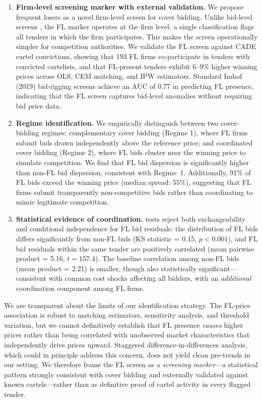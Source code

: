 \begin{enumerate}
\item \textbf{Firm-level screening marker with external validation.} We propose frequent losers as a novel firm-level screen for cover bidding. Unlike bid-level screens \citep{bajari2003deciding, imhof2019detecting}, the FL marker operates at the firm level: a single classification flags all tenders in which the firm participates. This makes the screen operationally simpler for competition authorities. We validate the FL screen against CADE cartel convictions, showing that 193 FL firms co-participate in tenders with convicted cartelists, and that FL-present tenders exhibit 6--9\% higher winning prices across OLS, CEM matching, and IPW estimators. Standard Imhof (2019) bid-rigging screens achieve an AUC of 0.77 in predicting FL presence, indicating that the FL screen captures bid-level anomalies without requiring bid price data.

\item \textbf{Regime identification.} We empirically distinguish between two cover-bidding regimes: complementary cover bidding (Regime 1), where FL firms submit bids drawn independently above the reference price; and coordinated cover bidding (Regime 2), where FL bids cluster near the winning price to simulate competition. We find that FL bid dispersion is significantly higher than non-FL bid dispersion, consistent with Regime~1. Additionally, 91\% of FL bids exceed the winning price (median spread: 55\%), suggesting that FL firms submit transparently non-competitive bids rather than coordinating to mimic legitimate competition.

\item \textbf{Statistical evidence of coordination.} \citet{bajari2003deciding} tests reject both exchangeability and conditional independence for FL bid residuals: the distribution of FL bids differs significantly from non-FL bids (KS statistic = 0.15, $p < 0.001$), and FL bid residuals within the same tender are positively correlated (mean pairwise product = 5.16, $t = 157.4$). The baseline correlation among non-FL bids (mean product = 2.21) is smaller, though also statistically significant---consistent with common cost shocks affecting all bidders, with an \textit{additional} coordination component among FL firms.
\end{enumerate}

We are transparent about the limits of our identification strategy. The FL-price association is robust to matching estimators, sensitivity analysis, and threshold variation, but we cannot definitively establish that FL presence \textit{causes} higher prices rather than being correlated with unobserved market characteristics that independently drive prices upward. Staggered difference-in-differences analysis, which could in principle address this concern, does not yield clean pre-trends in our setting. We therefore frame the FL screen as a \textit{screening marker}---a statistical pattern strongly consistent with cover bidding and externally validated against known cartels---rather than as definitive proof of cartel activity in every flagged tender.

